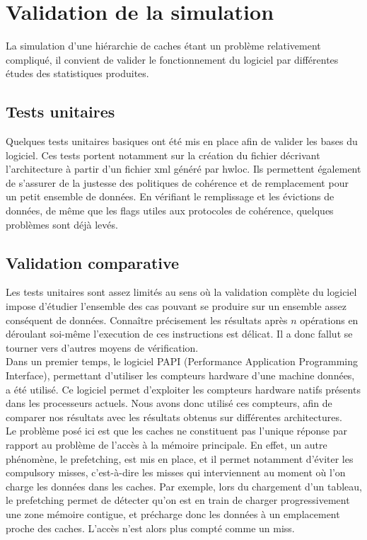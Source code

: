 \section{Validation de la simulation}
La simulation d'une hiérarchie de caches étant un problème relativement compliqué, il convient de valider le fonctionnement du logiciel par différentes études des statistiques produites.

\subsection{Tests unitaires}

Quelques tests unitaires basiques ont été mis en place afin de valider les bases du logiciel. Ces tests portent notamment sur la création du fichier décrivant l'architecture à partir d'un fichier xml généré par hwloc. Ils permettent également de s'assurer de la justesse des politiques de cohérence et de remplacement pour un petit ensemble de données. En vérifiant le remplissage et les évictions de données, de même que les flags utiles aux protocoles de cohérence, quelques problèmes sont déjà levés.

\subsection{Validation comparative}

Les tests unitaires sont assez limités au sens où la validation complète du logiciel impose d'étudier l'ensemble des cas pouvant se produire sur un ensemble assez conséquent de données. Connaître précisement les résultats après $n$ opérations en déroulant soi-même l'execution de ces instructions est délicat. Il a donc fallut se tourner vers d'autres moyens de vérification. \\

Dans un premier temps, le logiciel PAPI (Performance Application Programming Interface), permettant d'utiliser les compteurs hardware d'une machine données, a été utilisé. Ce logiciel permet d'exploiter les compteurs hardware natifs présents dans les processeurs actuels. Nous avons donc utilisé ces compteurs, afin de comparer nos résultats avec les résultats obtenus sur différentes architectures. \\

Le problème posé ici est que les caches ne constituent pas l'unique réponse par rapport au problème de l'accès à la mémoire principale. En effet, un autre phénomène, le prefetching, est mis en place, et il permet notamment d'éviter les compulsory misses, c'est-à-dire les misses qui interviennent au moment où l'on charge les données dans les caches. Par exemple, lors du chargement d'un tableau, le prefetching permet de détecter qu'on est en train de charger progressivement une zone mémoire contigue, et précharge donc les données à un emplacement proche des caches. L'accès n'est alors plus compté comme un miss. \\

